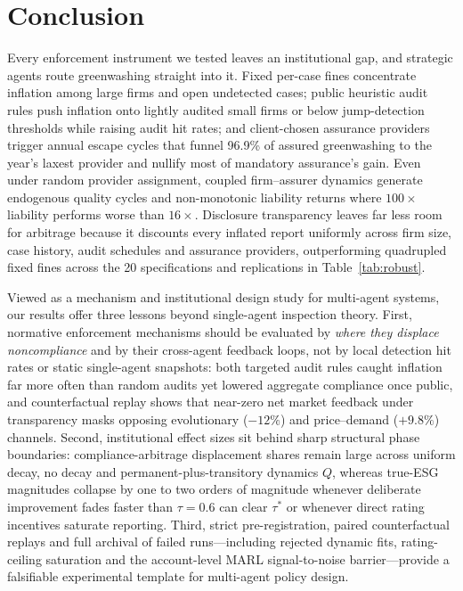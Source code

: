 \documentclass[11pt]{article}
\begin{document}
\section{Conclusion}\label{sec:conclusion}

Every enforcement instrument we tested leaves an institutional gap, and strategic agents route greenwashing straight into it. Fixed per-case fines concentrate inflation among large firms and open undetected cases; public heuristic audit rules push inflation onto lightly audited small firms or below jump-detection thresholds while raising audit hit rates; and client-chosen assurance providers trigger annual escape cycles that funnel 96.9\% of assured greenwashing to the year's laxest provider and nullify most of mandatory assurance's gain. Even under random provider assignment, coupled firm--assurer dynamics generate endogenous quality cycles and non-monotonic liability returns where $100\times$ liability performs worse than $16\times$. Disclosure transparency leaves far less room for arbitrage because it discounts every inflated report uniformly across firm size, case history, audit schedules and assurance providers, outperforming quadrupled fixed fines across the 20 specifications and replications in Table~\ref{tab:robust}.

Viewed as a mechanism and institutional design study for multi-agent systems, our results offer three lessons beyond single-agent inspection theory. First, normative enforcement mechanisms should be evaluated by \emph{where they displace noncompliance} and by their cross-agent feedback loops, not by local detection hit rates or static single-agent snapshots: both targeted audit rules caught inflation far more often than random audits yet lowered aggregate compliance once public, and counterfactual replay shows that near-zero net market feedback under transparency masks opposing evolutionary ($-12\%$) and price--demand ($+9.8\%$) channels. Second, institutional effect sizes sit behind sharp structural phase boundaries: compliance-arbitrage displacement shares remain large across uniform decay, no decay and permanent-plus-transitory dynamics $Q$, whereas true-ESG magnitudes collapse by one to two orders of magnitude whenever deliberate improvement fades faster than $\tau = 0.6$ can clear $\tau^*$ or whenever direct rating incentives saturate reporting. Third, strict pre-registration, paired counterfactual replays and full archival of failed runs---including rejected dynamic fits, rating-ceiling saturation and the account-level MARL signal-to-noise barrier---provide a falsifiable experimental template for multi-agent policy design.
\end{document}
